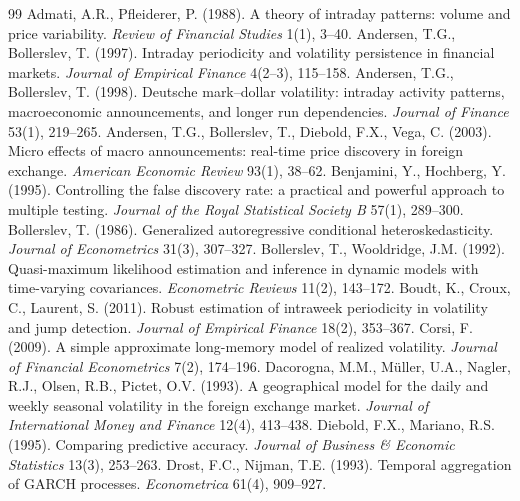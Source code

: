 \documentclass[11pt,a4paper]{article}
\begin{document}

\begin{thebibliography}{99}
 Admati, A.R., Pfleiderer, P. (1988). A theory of intraday patterns: volume and price variability. \emph{Review of Financial Studies} 1(1), 3--40.
 Andersen, T.G., Bollerslev, T. (1997). Intraday periodicity and volatility persistence in financial markets. \emph{Journal of Empirical Finance} 4(2--3), 115--158.
 Andersen, T.G., Bollerslev, T. (1998). Deutsche mark--dollar volatility: intraday activity patterns, macroeconomic announcements, and longer run dependencies. \emph{Journal of Finance} 53(1), 219--265.
 Andersen, T.G., Bollerslev, T., Diebold, F.X., Vega, C. (2003). Micro effects of macro announcements: real-time price discovery in foreign exchange. \emph{American Economic Review} 93(1), 38--62.
 Benjamini, Y., Hochberg, Y. (1995). Controlling the false discovery rate: a practical and powerful approach to multiple testing. \emph{Journal of the Royal Statistical Society B} 57(1), 289--300.
 Bollerslev, T. (1986). Generalized autoregressive conditional heteroskedasticity. \emph{Journal of Econometrics} 31(3), 307--327.
 Bollerslev, T., Wooldridge, J.M. (1992). Quasi-maximum likelihood estimation and inference in dynamic models with time-varying covariances. \emph{Econometric Reviews} 11(2), 143--172.
 Boudt, K., Croux, C., Laurent, S. (2011). Robust estimation of intraweek periodicity in volatility and jump detection. \emph{Journal of Empirical Finance} 18(2), 353--367.
 Corsi, F. (2009). A simple approximate long-memory model of realized volatility. \emph{Journal of Financial Econometrics} 7(2), 174--196.
 Dacorogna, M.M., M\"uller, U.A., Nagler, R.J., Olsen, R.B., Pictet, O.V. (1993). A geographical model for the daily and weekly seasonal volatility in the foreign exchange market. \emph{Journal of International Money and Finance} 12(4), 413--438.
 Diebold, F.X., Mariano, R.S. (1995). Comparing predictive accuracy. \emph{Journal of Business \& Economic Statistics} 13(3), 253--263.
 Drost, F.C., Nijman, T.E. (1993). Temporal aggregation of GARCH processes. \emph{Econometrica} 61(4), 909--927.

\end{thebibliography}
\end{document}
